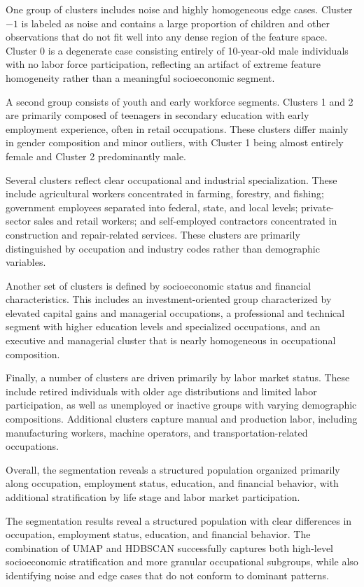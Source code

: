 One group of clusters includes noise and highly homogeneous edge cases. Cluster $-1$ is labeled as noise and contains a large proportion of children and other observations that do not fit well into any dense region of the feature space. Cluster 0 is a degenerate case consisting entirely of 10-year-old male individuals with no labor force participation, reflecting an artifact of extreme feature homogeneity rather than a meaningful socioeconomic segment.

A second group consists of youth and early workforce segments. Clusters 1 and 2 are primarily composed of teenagers in secondary education with early employment experience, often in retail occupations. These clusters differ mainly in gender composition and minor outliers, with Cluster 1 being almost entirely female and Cluster 2 predominantly male.

Several clusters reflect clear occupational and industrial specialization. These include agricultural workers concentrated in farming, forestry, and fishing; government employees separated into federal, state, and local levels; private-sector sales and retail workers; and self-employed contractors concentrated in construction and repair-related services. These clusters are primarily distinguished by occupation and industry codes rather than demographic variables.

Another set of clusters is defined by socioeconomic status and financial characteristics. This includes an investment-oriented group characterized by elevated capital gains and managerial occupations, a professional and technical segment with higher education levels and specialized occupations, and an executive and managerial cluster that is nearly homogeneous in occupational composition.

Finally, a number of clusters are driven primarily by labor market status. These include retired individuals with older age distributions and limited labor participation, as well as unemployed or inactive groups with varying demographic compositions. Additional clusters capture manual and production labor, including manufacturing workers, machine operators, and transportation-related occupations.

Overall, the segmentation reveals a structured population organized primarily along occupation, employment status, education, and financial behavior, with additional stratification by life stage and labor market participation.

The segmentation results reveal a structured population with clear differences in occupation, employment status, education, and financial behavior. The combination of UMAP and HDBSCAN successfully captures both high-level socioeconomic stratification and more granular occupational subgroups, while also identifying noise and edge cases that do not conform to dominant patterns.

